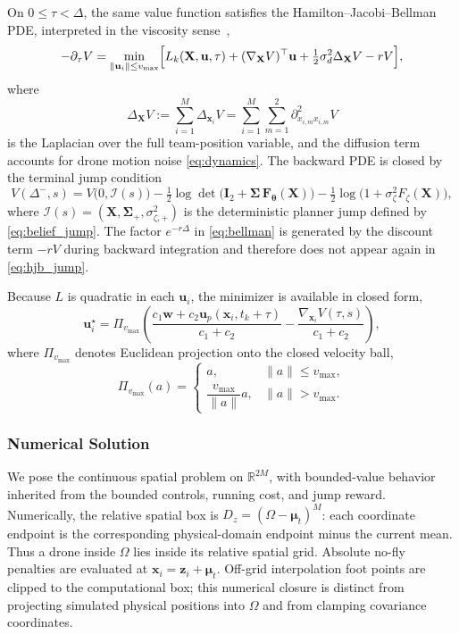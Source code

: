 \documentclass{article}
\newcommand{\R}{\mathbb{R}}
\newcommand{\norm}[1]{\left\|#1\right\|}
\newcommand{\bs}[1]{\boldsymbol{#1}}
\newcommand{\x}{\mathbf{x}}
\renewcommand{\u}{\mathbf{u}}
\newcommand{\z}{\mathbf{z}}
\newcommand{\bX}{\mathbf{X}}
\begin{document}
On $0\le\tau<\Delta$, the same value function satisfies the Hamilton--Jacobi--Bellman PDE, interpreted in the viscosity sense~\cite{crandall1992viscosity},
\begin{equation}
\label{eq:hjb_pde}
-\partial_\tau V = \min_{\norm{\u_i}\le v_{\max}}
\Bigl[
L_k(\bX,\u,\tau)+(\nabla_{\bX}V)^\top\u
+\tfrac12\sigma_d^2\Delta_{\bX}V-rV
\Bigr],
\end{equation}
where
\begin{equation}
\Delta_{\bX}V:=\sum_{i=1}^M \Delta_{\x_i}V
=\sum_{i=1}^M\sum_{m=1}^2 \partial_{x_{i,m}x_{i,m}}^2 V
\end{equation}
is the Laplacian over the full team-position variable, and the diffusion term accounts for drone motion noise \eqref{eq:dynamics}.
The backward PDE is closed by the terminal jump condition
\begin{equation}
\label{eq:hjb_jump}
V(\Delta^-,s)
=V\bigl(0,\mathcal I(s)\bigr)
-\tfrac12\log\det\!\bigl(\bs I_2+\bs\Sigma\,\bs F_{\bs\theta}(\bX)\bigr)
-\tfrac12\log\bigl(1+\sigma_\zeta^2 F_\zeta(\bX)\bigr),
\end{equation}
where $\mathcal I(s)=(\bX,\bs\Sigma_+,\sigma_{\zeta,+}^2)$ is the deterministic planner jump defined by \eqref{eq:belief_jump}.
The factor $e^{-r\Delta}$ in \eqref{eq:bellman} is generated by the discount term $-rV$ during backward integration and therefore does not appear again in \eqref{eq:hjb_jump}.

Because $L$ is quadratic in each $\u_i$, the minimizer is available in closed form,
\begin{equation}
\label{eq:optimal_control}
\u_i^\star
=\Pi_{v_{\max}}\!\left(
\frac{c_1\bs w+c_2\u_p(\x_i,t_k+\tau)}{c_1+c_2}-\frac{\nabla_{\x_i}V(\tau,s)}{c_1+c_2}
\right),
\end{equation}
where $\Pi_{v_{\max}}$ denotes Euclidean projection onto the closed velocity ball,
\begin{equation}
\Pi_{v_{\max}}(a)=
\begin{cases}
a, & \|a\|\le v_{\max},\\[2mm]
\dfrac{v_{\max}}{\|a\|}a, & \|a\|>v_{\max}.
\end{cases}
\end{equation}

\subsubsection{Numerical Solution}

We pose the continuous spatial problem on $\R^{2M}$, with bounded-value behavior inherited from the bounded controls, running cost, and jump reward.
Numerically, the relative spatial box is $D_z=(\Omega-\bs\mu_t)^M$: each coordinate endpoint is the corresponding physical-domain endpoint minus the current mean.
Thus a drone inside $\Omega$ lies inside its relative spatial grid.
Absolute no-fly penalties are evaluated at $\x_i=\z_i+\bs\mu_t$.
Off-grid interpolation foot points are clipped to the computational box; this numerical closure is distinct from projecting simulated physical positions into $\Omega$ and from clamping covariance coordinates.
\end{document}
